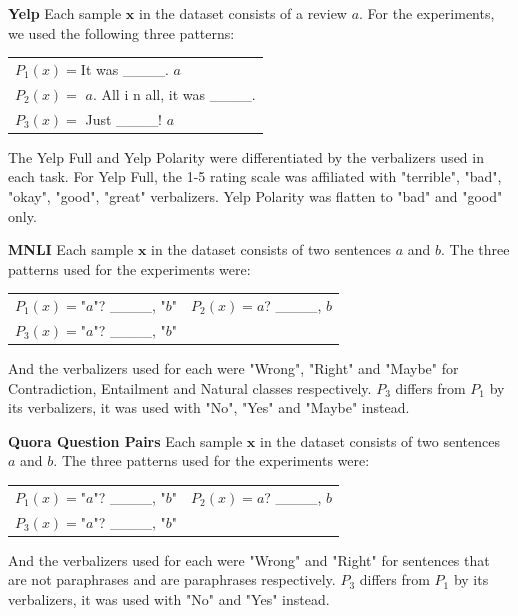 \documentclass[11pt,a4paper]{article}
\begin{document}
\vspace{8pt}
\noindent \textbf{Yelp} \quad
Each sample $\textbf{x}$ in the dataset consists of a review $a$.
For the experiments, we used the following three patterns:
\begin{table}[H]
	\renewcommand{\arraystretch}{1.5}
	\begin{tabularx}{\textwidth}{l}
		$P_1(x)=$It was \_\_\_\_. $a$ \\
		$P_2(x)=$ $a$. All i n all, it was \_\_\_\_. \\
		$P_3(x)=$ Just \_\_\_\_! $a$  \\
	\end{tabularx}
\end{table}
The Yelp Full and Yelp Polarity were differentiated by the verbalizers used in each task.
For Yelp Full, the 1-5 rating scale was affiliated with "terrible", "bad", "okay", "good", "great" verbalizers.
Yelp Polarity was flatten to "bad" and "good" only.

\vspace{8pt}
\noindent \textbf{MNLI} \quad
Each sample $\textbf{x}$ in the dataset consists of two sentences $a$ and $b$.
The three patterns used for the experiments were:
\begin{table}[H]
	\renewcommand{\arraystretch}{1.5}
	\begin{tabularx}{\textwidth}{cc}
		$P_1(x)=$"$a$"? \_\_\_\_, "$b$" & $P_2(x)=$$a$? \_\_\_\_, $b$ \\
		$P_3(x)=$"$a$"? \_\_\_\_, "$b$" & \\
	\end{tabularx}
\end{table}
And the verbalizers used for each were "Wrong", "Right" and "Maybe" for Contradiction, Entailment and Natural classes respectively.
$P_3$ differs from $P_1$ by its verbalizers, it was used with "No", "Yes" and "Maybe" instead.

\vspace{8pt}
\noindent \textbf{Quora Question Pairs} \quad
Each sample $\textbf{x}$ in the dataset consists of two sentences $a$ and $b$.
The three patterns used for the experiments were:
\begin{table}[H]
	\renewcommand{\arraystretch}{1.5}
	\begin{tabularx}{\textwidth}{cc}
		$P_1(x)=$"$a$"? \_\_\_\_, "$b$" & $P_2(x)=$$a$? \_\_\_\_, $b$ \\ 
		$P_3(x)=$"$a$"? \_\_\_\_, "$b$" & \\
	\end{tabularx}
\end{table}
And the verbalizers used for each were "Wrong" and "Right" for sentences that are not paraphrases and are paraphrases respectively.
$P_3$ differs from $P_1$ by its verbalizers, it was used with "No" and "Yes" instead.
\end{document}
